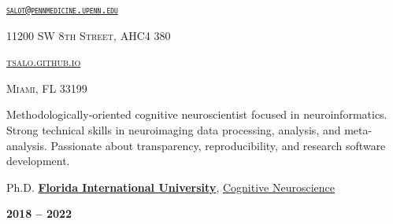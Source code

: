 \documentclass[10pt]{article}
\date{}
\newcommand{\namestyle}{\Huge \fontfamily{lmr}\selectfont}
\newcommand{\iconstyle}{\LARGE}
\newcommand{\headstyle}{\scshape \normalsize \textcolor{light-gray}}
\newcommand{\sectionstyle}{\LARGE \fontfamily{lmr}\selectfont}
\begin{document}
\begin{center}
	\namestyle{TAYLOR SALO}

	\bigskip

	\iconstyle{\href{https://github.com/tsalo}{\faGithubSquare}}
	\enspace
	\iconstyle{\href{https://orcid.org/0000-0001-9813-3167}{}}
	\enspace
	\iconstyle{\href{https://scholar.google.com/citations?user=IPacJoAAAAAJ}{}}
	\enspace
	\iconstyle{\href{https://osf.io/iwpvm/}{}}
\end{center}

\begin{minipage}[t]{.5\linewidth}
\flushleft
\headstyle{\href{mailto:salot@pennmedicine.upenn.edu}{\nolinkurl{salot@pennmedicine.upenn.edu}}}
\end{minipage}
\hfill
\begin{minipage}[t]{.5\linewidth}
\flushright
\headstyle{11200 SW 8th Street, AHC4 380}
\end{minipage}

\begin{minipage}[t]{.3\linewidth}
\flushleft
\headstyle{\href{https://tsalo.github.io}{tsalo.github.io}}
\end{minipage}
\hfill
\begin{minipage}[t]{.7\linewidth}
\flushright
\headstyle{Miami, FL 33199}
\end{minipage}


\bigskip

\begin{center}\sectionstyle{PROFILE}\end{center}

Methodologically-oriented cognitive neuroscientist focused in neuroinformatics.
Strong technical skills in neuroimaging data processing, analysis, and meta-analysis.
Passionate about transparency, reproducibility, and research software development.

\bigskip

\begin{center}\sectionstyle{EDUCATION}\end{center}

\begin{minipage}[t]{.7\linewidth}
	\flushleft
	\noindent
	Ph.D.
	\href{https://fiu.edu}{\textbf{Florida International University}},
	\href{https://case.fiu.edu/psychology/phd-in-cognitive-neuroscience/}{Cognitive Neuroscience}
	\end{minipage}
	\hfill
	\begin{minipage}[t]{.3\linewidth}
	\flushright
	\noindent
	\textsc{\textbf{2018 -- 2022}}
\end{minipage}
\end{document}
